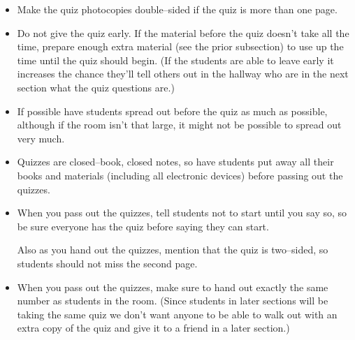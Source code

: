 \documentclass[12pt]{article}
\begin{document}
      \begin{itemize}
  
        \addtolength{\itemsep}{-1mm}
  
        \item Make the quiz photocopies double--sided if the quiz is more
              than one page.
  
        \item Do not give the quiz early.  If the material before the quiz
              doesn't take all the time, prepare enough extra material (see
              the prior subsection) to use up the time until the quiz should
              begin.  (If the students are able to leave early it increases
              the chance they'll tell others out in the hallway who are in
              the next section what the quiz questions are.)
  
        \item If possible have students spread out before the quiz as much
              as possible, although if the room isn't that large, it might
              not be possible to spread out very much.
  
        \item Quizzes are closed--book, closed notes, so have students put
              away all their books and materials (including all electronic
              devices) before passing out the quizzes.
  
        \item When you pass out the quizzes, tell students not to start
              until you say so, so be sure everyone has the quiz before saying
              they can start.
  
              Also as you hand out the quizzes, mention that the quiz is
              two--sided, so students should not miss the second page.
  
        \item When you pass out the quizzes, make sure to hand out exactly
              the same number as students in the room.  (Since students in
              later sections will be taking the same quiz we don't want
              anyone to be able to walk out with an extra copy of the quiz
              and give it to a friend in a later section.)
  

\end{itemize}
\end{document}
